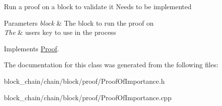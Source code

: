 Run a proof on a block to validate it Needs to be implemented


\begin{DoxyParams}{Parameters}
{\em block} & The block to run the proof on \\
\hline
{\em The} & user\textquotesingle{}s key to use in the process \\
\hline
\end{DoxyParams}


Implements \mbox{\hyperlink{classProof_a6ab9f6c3f603447e3a9c7c932b5deac4}{Proof}}.



The documentation for this class was generated from the following files\+:\begin{DoxyCompactItemize}
\item 
block\+\_\+chain/chain/block/proof/Proof\+Of\+Importance.\+h\item 
block\+\_\+chain/chain/block/proof/Proof\+Of\+Importance.\+cpp\end{DoxyCompactItemize}
